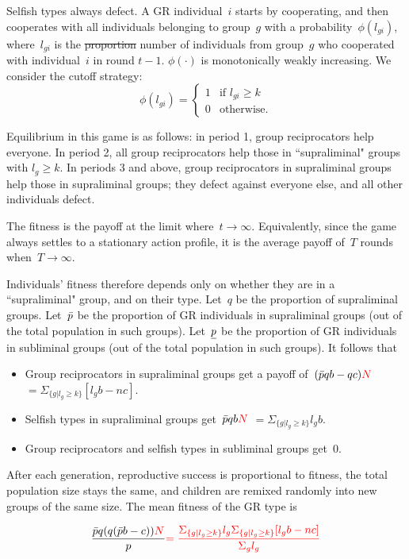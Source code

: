 \documentclass[12pt,a4paper]{article}
\newcommand{\mm}[1]{{\color{red} #1}}
\begin{document}
Selfish types always defect. A GR individual~$i$ starts by cooperating, and then cooperates with all individuals belonging to group~$g$ with a probability~$\phi(l_{gi})$, where~$l_{gi}$ is the \sout{proportion} \mm{number} of individuals from group~$g$ who cooperated with individual~$i$ in round $t-1$.
$\phi(\cdot)$ is monotonically weakly increasing. We consider the cutoff strategy: 
$$
    \phi(l_{gi}) =
    \begin{cases}
        1   &   \text{if } l_{gi} \geq k  \\
        0   &   \text{otherwise.}
    \end{cases}
$$

Equilibrium in this game is as follows: in period 1, group reciprocators help
everyone. In period 2, all group reciprocators help those in ``supraliminal"
groups with $l_g \geq k$. In periods 3 and above, group reciprocators in supraliminal
groups help those in supraliminal groups; they defect against everyone else,
and all other individuals defect.

The fitness is the payoff at the limit where~$t\to\infty$. Equivalently, since the game always settles to a stationary action profile, it is the average payoff of~$T$ rounds when~$T\to\infty$. 

%
Individuals' fitness therefore depends only on whether they are in a ``supraliminal" group, and on their type. Let~$q$ be the 
proportion of supraliminal groups. Let~$\bar{p}$ be the proportion of 
GR individuals in supraliminal groups (out of the total population in such groups). Let~$\underline{p}$ be the proportion of GR individuals in subliminal groups (out of the total population in such groups). It follows that
\begin{itemize}
    \item Group reciprocators in supraliminal groups get a payoff of~$(\bpi qb - qc)\mm{N}$ \mm{$= \Sigma_{\{g|l_g \geq k\}}[l_gb-nc]$}.
    \item Selfish types in supraliminal groups get~$\bpi qb\mm{N}$ \mm{$= \Sigma_{\{g|l_g \geq k\}}l_gb$}.
    \item Group reciprocators and selfish types in subliminal groups get~$0$.
\end{itemize}

After each generation, reproductive success is proportional to fitness, the total population size stays the same, and children are remixed randomly into new groups of the same size.
%
The mean fitness of the GR type is

\begin{equation*}
\frac{
  \bpi q(q(\bpi b - c))\mm{N}
}{
  p
}
\mm{=\frac{\Sigma_{\{g|l_g \geq k\}}l_g \Sigma_{\{g|l_g \geq k\}}[l_gb-nc]}{\Sigma_gl_g}}
\end{equation*}
\end{document}
